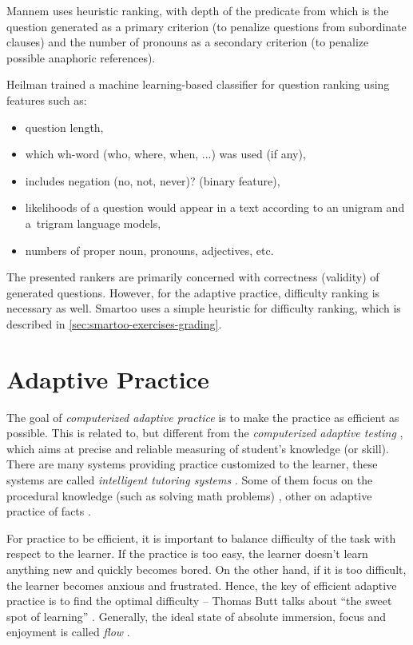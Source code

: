 \documentclass[12pt, twoside]{fithesis2}
\renewcommand{\_}{\leavevmode \kern0.07em\vbox{\hrule width0.4em}}
\newcommand{\squarebullet}{\textcolor{black}{\raisebox{0.15em}{\rule{4pt}{4pt}}}}
\newcommand{\emptysquarebullet}{\textcolor{black}{\raisebox{0.10em}{\tiny$\square$}}}
\newenvironment{myItemize}{
  \begin{itemize}[leftmargin=2em,rightmargin=1em,itemsep=\parskip ,parsep=0em,topsep=0em,partopsep=0em]
  \renewcommand{\labelitemi}{\squarebullet}
  \renewcommand{\labelitemii}{\textbullet}
}{
  \end{itemize}
}
\begin{document}
Mannem \cite{question-gen-mannem} uses heuristic ranking,
with depth of the predicate from which is the question generated as a primary criterion
(to penalize questions from subordinate clauses)
and the number of pronouns as a secondary criterion (to penalize possible anaphoric references).

Heilman \cite{question-gen-heilman} trained a machine learning-based classifier for question ranking using features such as:
\begin{myItemize}
\item question length,
\item which wh-word (who, where, when, ...) was used (if any),
\item includes negation (no, not, never)? (binary feature),
\item likelihoods of a question would appear in a text according to an unigram and a~trigram language models,
\item numbers of proper noun, pronouns, adjectives, etc.
\end{myItemize}

The presented rankers are primarily concerned with correctness (validity) of generated questions.
However, for the adaptive practice, difficulty ranking is necessary as well.
Smartoo uses a simple heuristic for difficulty ranking, which is described in \autoref{sec:smartoo-exercises-grading}.


\chapter{Adaptive Practice}
\label{chap:practice}

The goal of \emph{computerized adaptive practice} \cite{adaptive-practice-irt-math}
is to make the practice as efficient as possible.
This is related to, but different from the \emph{computerized adaptive testing} \cite{computerized-adaptive-testing},
which aims at precise and reliable measuring of student's knowledge (or skill).
There are many systems providing practice customized to the learner,
these systems are called \emph{intelligent tutoring systems} \cite{tutoring-systems-behavior}.
Some of them focus on the procedural knowledge (such as solving math problems) \cite{adaptive-practice-irt-math},
other on adaptive practice of facts \cite{slepe-mapy}.

For practice to be efficient, it is important to balance difficulty of the task with respect to the learner.
If the practice is too easy, the learner doesn't learn anything new and quickly becomes bored.
On the other hand, if it is too difficult, the learner becomes anxious and frustrated.
Hence, the key of efficient adaptive practice is to find the optimal difficulty --
Thomas Butt talks about ``the sweet spot of learning'' \cite{adaptive-practice}.
Generally, the ideal state of absolute immersion, focus and enjoyment is called \emph{flow} \cite{flow}.
\end{document}
